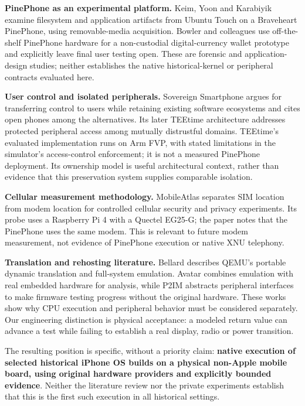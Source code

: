 \documentclass[10pt,letterpaper,twocolumn]{article}
\begin{document}
\textbf{PinePhone as an experimental platform.} Keim, Yoon and Karabiyik examine filesystem and application artifacts from Ubuntu Touch on a Braveheart PinePhone, using removable-media acquisition. Bowler and colleagues use off-the-shelf PinePhone hardware for a non-custodial digital-currency wallet prototype and explicitly leave final user testing open. These are forensic and application-design studies; neither establishes the native historical-kernel or peripheral contracts evaluated here. \cite{ref-17} \cite{ref-18}

\textbf{User control and isolated peripherals.} Sovereign Smartphone argues for transferring control to users while retaining existing software ecosystems and cites open phones among the alternatives. Its later TEEtime architecture addresses protected peripheral access among mutually distrustful domains. TEEtime's evaluated implementation runs on Arm FVP, with stated limitations in the simulator's access-control enforcement; it is not a measured PinePhone deployment. Its ownership model is useful architectural context, rather than evidence that this preservation system supplies comparable isolation. \cite{ref-19} \cite{ref-20}

\textbf{Cellular measurement methodology.} MobileAtlas separates SIM location from modem location for controlled cellular security and privacy experiments. Its probe uses a Raspberry Pi 4 with a Quectel EG25-G; the paper notes that the PinePhone uses the same modem. This is relevant to future modem measurement, not evidence of PinePhone execution or native XNU telephony. \cite{ref-21}

\textbf{Translation and rehosting literature.} Bellard describes QEMU's portable dynamic translation and full-system emulation. Avatar combines emulation with real embedded hardware for analysis, while P2IM abstracts peripheral interfaces to make firmware testing progress without the original hardware. These works show why CPU execution and peripheral behavior must be considered separately. Our engineering distinction is physical acceptance: a modeled return value can advance a test while failing to establish a real display, radio or power transition. \cite{ref-12} \cite{ref-13} \cite{ref-14}

The resulting position is specific, without a priority claim: \textbf{native execution of selected historical iPhone OS builds on a physical non-Apple mobile board, using original hardware providers and explicitly bounded evidence}. Neither the literature review nor the private experiments establish that this is the first such execution in all historical settings.
\end{document}
